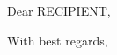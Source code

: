 \documentclass[11pt,icelandic,a4paper]{letter}
\begin{document}
\begin{letter}{}
\opening{Dear RECIPIENT,}

\lipsum[1]

\flushright\closing{With best regards,}
\end{letter}
\end{document}
